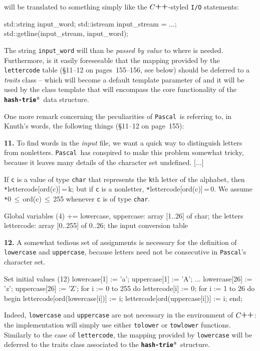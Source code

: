 \documentclass[a4paper,11pt]{article}
\renewcommand{\=}{\protect\nobreakdash-\hspace{0pt}}
\renewcommand{\~}{\protect\nobreakdash--\hspace{0pt}}
\newcommand{\plusplus}{\textbf{\raisebox{1pt}{++}}}
\newcommand{\cplusplus}{$C\plusplus$}
\newcommand{\pascal}{\code{Pascal}}
\newcommand{\hashtrie}{{\tt\textbf{hash-trie}}}
\newcommand\hashtrie*{\emph{hash\=trie}}
\newcommand{\code}[1]{{\tt{#1}}}
\newcommand\code*[1]{\mbox{\code{#1}}}
\newcommand{\pag}[1]{page~#1}
\newcommand{\pages}[2]{pages~#1\~#2}
\newcommand{\paras}[2]{\mbox{\S\hspace{1pt}#1--#2}}
\newcommand{\paraspag}[3]{\paras{#1}{#2} on \pag{#3}}
\newcommand{\paraspages}[4]{\paras{#1}{#2} on \pages{#3}{#4}}
\begin{document}
%
will be translated to something simply like the \cplusplus\=styled \code{I/O}
statements:
%
\begin{cpplisting}
std::string  input_word;
std::istream input_stream = ...;
std::getline(input_stream, input_word);
\end{cpplisting}
%
The string \code{input\_word} will than be \emph{passed by value} to where is
needed. Furthermore, is it easily foreseeable that the mapping provided by the
\code{lettercode} table (\paraspages{11}{12}{155}{156}, see below) should
be deferred to a \emph{traits} class -- which will become a default template
parameter of and it will be used by the class template that will encompass the
core functionality of the \hashtrie*\ data structure.

One more remark concerning the peculiarities of \pascal\ is referring to, in
Knuth's words, the following things (\paraspag{11}{12}{155}):
%
\begin{quoting}
\textbf{11.} To find words in the \emph{input} file, we want a quick way to
distinguish letters from nonletters. \pascal\ has conspired to make this problem
somewhat tricky, because it leaves many details of the character set undefined.
[...]

If \code{c} is a value of type \code{char} that represents the \code{k}th
letter of the alphabet, then \code*{lettercode[ord(c)]\,=\,k}; but
if \code{c} is a nonletter, \code*{lettercode[ord(c)]\,=\,0}. We assume
\code*{0\,$\le$\,ord(c)\,$\le\,$255} whenever \code{c} is of type \code{char}.
\end{quoting}
%
\vspace{-\partopsep}
%
\label{pascal-lettercode-begin}
\begin{paslisting}[name=lettercode]
{ Global variables (4) += }
lowercase, uppercase: array [1..26] of char; { the letters }
lettercode: array [0..255] of 0..26; { the input conversion table }
\end{paslisting}
%
\vspace{-\partopsep}
%
\begin{quoting}
\textbf{12.} A somewhat tedious set of assignments is necessary for the
definition of \code{lowercase} and \code{uppercase}, because letters need not
be consecutive in \pascal's character set.
\end{quoting}
%
\vspace{-\partopsep}
%
\begin{paslisting}[name=lettercode]
{ Set initial values (12) }
lowercase[1] := 'a'; uppercase[1] := 'A';
...
lowercase[26] := 'z'; uppercase[26] := 'Z';
for i := 0 to 255 do
  lettercode[i] := 0;
for i := 1 to 26 do
begin
  lettercode[ord(lowercase[i])] := i;
  lettercode[ord(uppercase[i])] := i;
end;
\end{paslisting}
\label{pascal-lettercode-end}
%
Indeed, \code{lowercase} and \code{uppercase} are not necessary in the
environment of \cplusplus: the implementation will simply use either
\code{tolower} or \code{towlower} functions. Similarly to the case of
\code{lettercode}, the mapping provided by \code{lowercase} will be deferred
to the traits class associated to the \hashtrie*\ structure.
\end{document}
